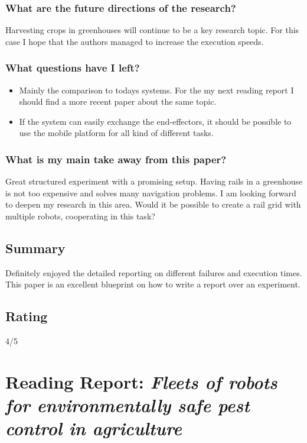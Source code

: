 \subsubsection*{What are the future directions of the research?}
Harvesting crops in greenhouses will continue to be a key research topic. For this case I hope that the authors managed to increase the execution speeds.
\subsubsection*{What questions have I left?} 
\begin{itemize}
    \item Mainly the comparison to todays systems. For the my next reading report I should find a more recent paper about the same topic.
    \item If the system can easily exchange the end-effectors, it should be possible to use the mobile platform for all kind of different tasks.
\end{itemize}
\subsubsection*{What is my main take away from this paper?}
Great structured experiment with a promising setup. Having rails in a greenhouse is not too expensive and solves many navigation problems. I am looking forward to deepen my research in this area.
Would it be possible to create a rail grid with multiple robots, cooperating in this task?

\subsection*{Summary}
Definitely enjoyed the detailed reporting on different failures and execution times. This paper is an excellent blueprint on how to write a report over an experiment.


\subsection*{Rating}
4/5


\section{Reading Report: \emph{Fleets of robots for environmentally safe pest control in agriculture}}
\cite{deSantos2016}

